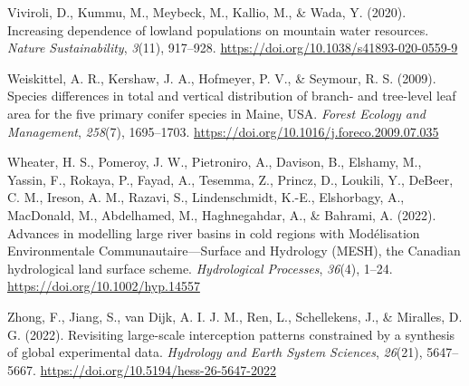 \documentclass[
]{agujournal2019}
\newlength{\cslhangindent}
\newenvironment{CSLReferences}[2] %
 {\begin{list}{}{%
  \setlength{\itemindent}{0pt}
  \setlength{\leftmargin}{0pt}
  \setlength{\parsep}{0pt}
  \ifodd #1
   \setlength{\leftmargin}{\cslhangindent}
   \setlength{\itemindent}{-1\cslhangindent}
  \fi
  \setlength{\itemsep}{#2\baselineskip}}}
 {\end{list}}
\begin{document}
\begin{CSLReferences}{1}{0}
Viviroli, D., Kummu, M., Meybeck, M., Kallio, M., \& Wada, Y. (2020).
Increasing dependence of lowland populations on mountain water
resources. \emph{Nature Sustainability}, \emph{3}(11), 917--928.
\url{https://doi.org/10.1038/s41893-020-0559-9}

Weiskittel, A. R., Kershaw, J. A., Hofmeyer, P. V., \& Seymour, R. S.
(2009). Species differences in total and vertical distribution of
branch- and tree-level leaf area for the five primary conifer species in
{Maine}, {USA}. \emph{Forest Ecology and Management}, \emph{258}(7),
1695--1703. \url{https://doi.org/10.1016/j.foreco.2009.07.035}

Wheater, H. S., Pomeroy, J. W., Pietroniro, A., Davison, B., Elshamy,
M., Yassin, F., Rokaya, P., Fayad, A., Tesemma, Z., Princz, D., Loukili,
Y., DeBeer, C. M., Ireson, A. M., Razavi, S., Lindenschmidt, K.-E.,
Elshorbagy, A., MacDonald, M., Abdelhamed, M., Haghnegahdar, A., \&
Bahrami, A. (2022). Advances in modelling large river basins in cold
regions with {Mod{é}lisation Environmentale Communautaire}---{Surface}
and {Hydrology} ({MESH}), the {Canadian} hydrological land surface
scheme. \emph{Hydrological Processes}, \emph{36}(4), 1--24.
\url{https://doi.org/10.1002/hyp.14557}

Zhong, F., Jiang, S., van Dijk, A. I. J. M., Ren, L., Schellekens, J.,
\& Miralles, D. G. (2022). Revisiting large-scale interception patterns
constrained by a synthesis of global experimental data. \emph{Hydrology
and Earth System Sciences}, \emph{26}(21), 5647--5667.
\url{https://doi.org/10.5194/hess-26-5647-2022}

\end{CSLReferences}
\end{document}
